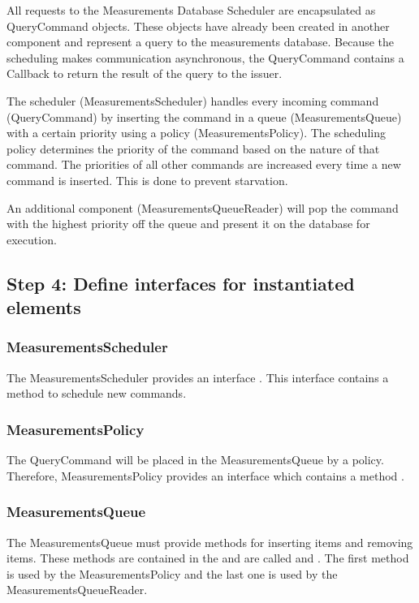 \npar All requests to the Measurements Database Scheduler are encapsulated as
QueryCommand objects. These objects have already been created in another
component and represent a query to the measurements database. Because the
scheduling makes communication asynchronous, the QueryCommand contains a
Callback to return the result of the query to the issuer.

\npar The scheduler (MeasurementsScheduler) handles every incoming command
(QueryCommand) by inserting the command in a queue (MeasurementsQueue) with a
certain priority using a policy (MeasurementsPolicy). The scheduling policy
determines the priority of the command based on the nature of that command. The
priorities of all other commands are increased every time a new command is
inserted. This is done to prevent starvation.

\npar An additional component (MeasurementsQueueReader) will pop the command
with the highest priority off the queue and present it on the database for execution. 

\subsection{Step 4: Define interfaces for instantiated elements}
\label{add:it3/interfaces}

\subsubsection{MeasurementsScheduler}

\npar The MeasurementsScheduler provides an interface
. This interface contains a method
 to schedule new commands.

\subsubsection{MeasurementsPolicy}

\npar The QueryCommand will be placed in the MeasurementsQueue by a policy.
Therefore, MeasurementsPolicy provides an interface
 which contains a method
.

\subsubsection{MeasurementsQueue}

\npar The MeasurementsQueue must provide methods for inserting items and
removing items. These methods are contained in the
 and are called
 and
. The first method is used by the
MeasurementsPolicy and the last one is used by the MeasurementsQueueReader.

